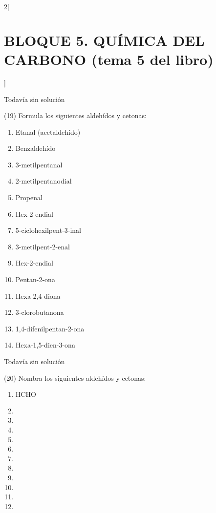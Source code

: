 \documentclass[10pt]{article}
\begin{document}
\begin{multicols}{2}[
  \section{BLOQUE 5. QUÍMICA DEL CARBONO (tema 5 del libro)}
  ]
\begin{solution}[print=false]
  Todavía sin solución
\end{solution}




\begin{exercise}[
    tags    = {},
    topics  = {química, química orgánica, orgánica},
    source  = {FQ 1B MGH 2016, p136, e19},
  ]
  (19) Formula los siguientes aldehídos y cetonas:
  \begin{enumerate}
    \item Etanal (acetaldehído)
    \item Benzaldehído
    \item 3-metilpentanal
    \item 2-metilpentanodial
    \item Propenal
    \item Hex-2-endial
    \item 5-ciclohexilpent-3-inal
    \item 3-metilpent-2-enal
    \item Hex-2-endial
    \item Pentan-2-ona
    \item Hexa-2,4-diona
    \item 3-clorobutanona
    \item 1,4-difenilpentan-2-ona
    \item Hexa-1,5-dien-3-ona
  \end{enumerate}
\end{exercise}

\begin{solution}[print=false]
  Todavía sin solución
\end{solution}




\begin{exercise}[
    tags    = {},
    topics  = {química, química orgánica, orgánica},
    source  = {FQ 1B MGH 2016, p136, e20},
  ]
  (20) Nombra los siguientes aldehídos y cetonas:

  \begin{enumerate}
    \item HCHO
    \item {}
    \item {}
    \item {}
    \item {}
    \item {}
    \item {}
    \item {}
    \item {}
    \item {}
    \item {}
    \item {}
  \end{enumerate}
\end{exercise}


\end{multicols}
\end{document}
